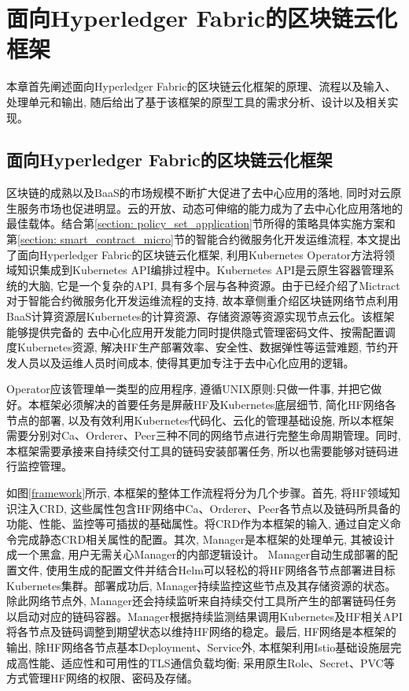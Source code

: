 \chapter{面向Hyperledger Fabric的区块链云化框架}

本章首先阐述面向Hyperledger Fabric的区块链云化框架的原理、流程以及输入、处理单元和输出, 随后给出了基于该框架的原型工具的需求分析、设计以及相关实现。

\section{面向Hyperledger Fabric的区块链云化框架}\label{section: framework}

区块链的成熟以及BaaS的市场规模不断扩大促进了去中心应用的落地, 同时对云原生服务市场也促进明显。云的开放、动态可伸缩的能力成为了去中心化应用落地的最佳载体。结合第\ref{section: policy_set_application}节所得的策略具体实施方案和第\ref{section: smart_contract_micro}节的智能合约微服务化开发运维流程, 本文提出了面向Hyperledger Fabric的区块链云化框架, 利用Kubernetes Operator方法将领域知识集成到Kubernetes API编排过程中\cite{henning2021reproducible}。Kubernetes API是云原生容器管理系统的大脑, 它是一个复杂的API, 具有多个层与各种资源\cite{Yilmaz2021}。由于已经介绍了Mictract对于智能合约微服务化开发运维流程的支持, 故本章侧重介绍区块链网络节点利用BaaS计算资源层Kubernetes的计算资源、存储资源等资源实现节点云化。该框架能够提供完备的 去中心化应用开发能力同时提供隐式管理密码文件、按需配置调度Kubernetes资源, 解决HF生产部署效率、安全性、数据弹性等运营难题, 节约开发人员以及运维人员时间成本, 使得其更加专注于去中心化应用的逻辑。

Operator应该管理单一类型的应用程序, 遵循UNIX原则:只做一件事, 并把它做好\cite{d2020design}。本框架必须解决的首要任务是屏蔽HF及Kubernetes底层细节, 简化HF网络各节点的部署, 以及有效利用Kubernetes代码化、云化的管理基础设施, 所以本框架需要分别对Ca、Orderer、Peer三种不同的网络节点进行完整生命周期管理。同时, 本框架需要承接来自持续交付工具的链码安装部署任务, 所以也需要能够对链码进行监控管理。

如图\ref{framework}所示, 本框架的整体工作流程将分为几个步骤。首先, 将HF领域知识注入CRD, 这些属性包含HF网络中Ca、Orderer、Peer各节点以及链码所具备的功能、性能、监控等可插拔的基础属性。将CRD作为本框架的输入, 通过自定义命令完成静态CRD相关属性的配置。其次, Manager是本框架的处理单元, 其被设计成一个黑盒\cite{yu2020system}, 用户无需关心Manager的内部逻辑设计。 Manager自动生成部署的配置文件, 使用生成的配置文件并结合Helm可以轻松的将HF网络各节点部署进目标Kubernetes集群。部署成功后, Manager持续监控这些节点及其存储资源的状态。除此网络节点外, Manager还会持续监听来自持续交付工具所产生的部署链码任务以启动对应的链码容器。Manager根据持续监测结果调用Kubernetes及HF相关API将各节点及链码调整到期望状态以维持HF网络的稳定。最后, HF网络是本框架的输出, 除HF网络各节点基本Deployment、Service外, 本框架利用Istio基础设施层完成高性能、适应性和可用性\cite{li2019service}\cite{larsson2020impact}的TLS通信负载均衡; 采用原生Role、Secret、PVC等方式管理HF网络的权限、密码及存储。

